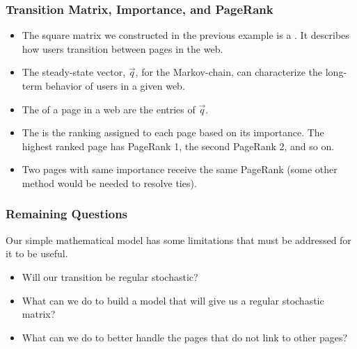 \begin{frame}
\frametitle{Transition Matrix, Importance, and PageRank}

    \begin{itemize}
        \item<2-> The square matrix we constructed in the previous example is a . It describes how users transition between pages in the web. 
        \item<3-> The steady-state vector, $\vec q$, for the Markov-chain, can characterize the long-term behavior of users in a given web. 
        \item<4-> The  of a page in a web are the entries of $\vec q$.
        \item<5-> The  is the ranking assigned to each page based on its importance. The highest ranked page has PageRank 1, the second PageRank 2, and so on. 
        \item<6-> Two pages with same importance receive the same PageRank (some other method would be needed to resolve ties).
    \end{itemize}

    

\end{frame}



\begin{frame}
\frametitle{Remaining Questions}

    Our simple mathematical model has some limitations that must be addressed for it to be useful. 
    
    \begin{itemize}
        \item<2-> Will our transition be regular stochastic? 
        \item<3-> What can we do to build a model that will give us a regular stochastic matrix? 
        \item<4-> What can we do to better handle the pages that do not link to other pages? 
    \end{itemize}

\end{frame}


